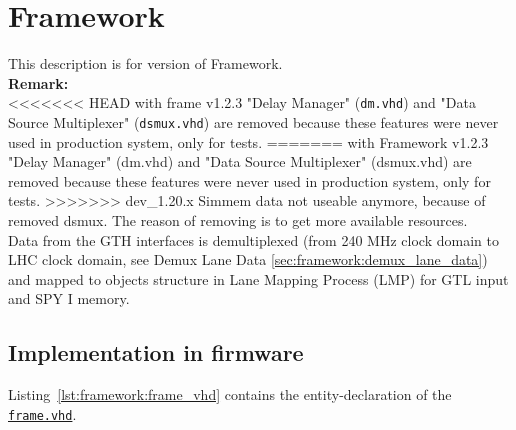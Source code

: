 \section{Framework}\label{sec:framework:framework}

This description is for version \versionframe of Framework.\\

\textbf{Remark:}\\
<<<<<<< HEAD
with frame v1.2.3 "Delay Manager" (\texttt{dm.vhd}) and "Data Source Multiplexer" (\texttt{dsmux.vhd}) are removed because these features were never used in production system, only for tests.
=======
with Framework v1.2.3 "Delay Manager" (dm.vhd) and "Data Source Multiplexer" (dsmux.vhd) are removed because these features were never used in production system, only for tests.
>>>>>>> dev_1.20.x
Simmem data not useable anymore, because of removed dsmux.
The reason of removing is to get more available resources.\\

Data from the GTH interfaces is demultiplexed (from 240 MHz clock domain to LHC clock domain, see Demux Lane Data \ref{sec:framework:demux_lane_data}) and mapped to objects structure in Lane Mapping Process (LMP) for GTL input and SPY I memory.

\subsection{Implementation in firmware}
\label{sec:framework:implementation_firmware}

Listing~\ref{lst:framework:frame_vhd} contains the entity-declaration of the \href{https://github.com/cms-l1-globaltrigger/mp7_ugt_legacy/blob/master/firmware/hdl/payload/frame.vhd}{\texttt{frame.vhd}}.\\



\clearpage

